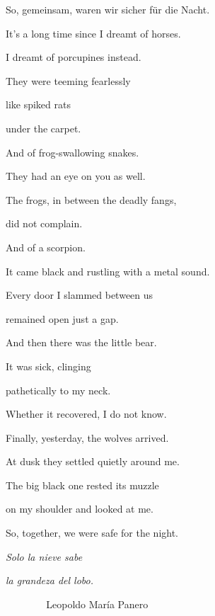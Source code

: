 \documentclass[a4paper]{article}
\begin{document}
So, gemeinsam, waren wir sicher für die Nacht.


\bigskip



\bigskip

It’s a long time since I dreamt of horses. 


\bigskip

I dreamt of porcupines instead.

They were teeming fearlessly

like spiked rats

under the carpet.


\bigskip

And of frog-swallowing snakes.

They had an eye on you as well.

The frogs, in between the deadly fangs,

did not complain. 


\bigskip

And of a scorpion.

It came black and rustling with a metal sound.

Every door I slammed between us

remained open just a gap.


\bigskip

And then there was the little bear.

It was sick, clinging 

pathetically to my neck.

Whether it recovered, I do not know.


\bigskip

Finally, yesterday, the wolves arrived.


\bigskip

At dusk they settled quietly around me.

The big black one rested its muzzle

on my shoulder and looked at me.

So, together, we were safe for the night.


\bigskip



\bigskip

{\itshape
Solo la nieve sabe}

{\itshape
la grandeza del lobo.}

\textit{\ \  \ \ \ \ \ \ }Leopoldo María Panero
\end{document}
